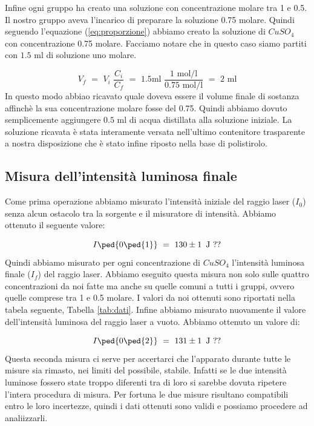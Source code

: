 Infine ogni gruppo ha creato una soluzione con concentrazione molare tra 1 e 0.5. Il nostro gruppo aveva l'incarico di preparare la soluzione 0.75 molare.
Quindi seguendo l'equazione (\ref{eq:proporzione}) abbiamo creato la soluzione di $CuSO_4$ con concentrazione 0.75 molare. Facciamo notare che in questo caso siamo partiti con $1.5\,\,\si{\milli\litre}$ di soluzione uno molare. 

\begin{equation*}
	V_f \,\, = \,\, V_i \,\, \frac{C_i}{C_f} \,\, = \,\, 1.5 \si{\milli\litre} \,\, \frac{1 \,\, \si{\mole\per\litre}}{0.75 \,\, \si{\mole\per\litre}} \,\, = \,\, 2 \,\, \si{\milli\litre}
\end{equation*}
%
In questo modo abbiao ricavato quale doveva essere il volume finale di sostanza affinchè la sua concentrazione molare fosse del 0.75. Quindi abbiamo dovuto semplicemente aggiungere $0.5\,\,\si{\milli\litre}$ di acqua distillata alla soluzione iniziale.
La soluzione ricavata è stata interamente versata nell'ultimo contenitore trasparente a nostra disposizione che è stato infine riposto nella base di polistirolo.

\subsection{Misura dell'intensità luminosa finale}

Come prima operazione abbiamo misurato l'intensità iniziale del raggio laser ($I_0$) senza alcun ostacolo tra la sorgente e il misuratore di intensità. Abbiamo ottenuto il seguente valore:

\begin{equation*}
	I\ped{0\ped{1}} \,\,=\,\, 130 \pm 1 \,\,\, \si{\joule} \,\, ??
\end{equation*}
%
Quindi abbiamo misurato per ogni concentrazione di $CuSO_4$ l'intensità luminosa finale ($I_f$) del raggio laser. Abbiamo eseguito questa misura non solo sulle quattro concentrazioni da noi fatte ma anche su quelle comuni a tutti i gruppi, ovvero quelle comprese tra 1 e 0.5 molare. I valori da noi ottenuti sono riportati nella tabela seguente, Tabella \ref{tab:dati}.
Infine abbiamo misurato nuovamente il valore dell'intensità luminosa del raggio laser a vuoto. Abbiamo ottenuto un valore di:

\begin{equation*}
	I\ped{0\ped{2}} \,\,=\,\, 131 \pm 1 \,\,\, \si{\joule} \,\, ??
\end{equation*}
%
Questa seconda misura ci serve per accertarci che l'apparato durante tutte le misure sia rimasto, nei limiti del possibile, stabile. Infatti se le due intensità luminose fossero state troppo diferenti tra di loro si sarebbe dovuta ripetere l'intera procedura di misura. Per fortuna le due misure risultano compatibili entro le loro incertezze, quindi i dati ottenuti sono validi e possiamo procedere ad analiizzarli.

